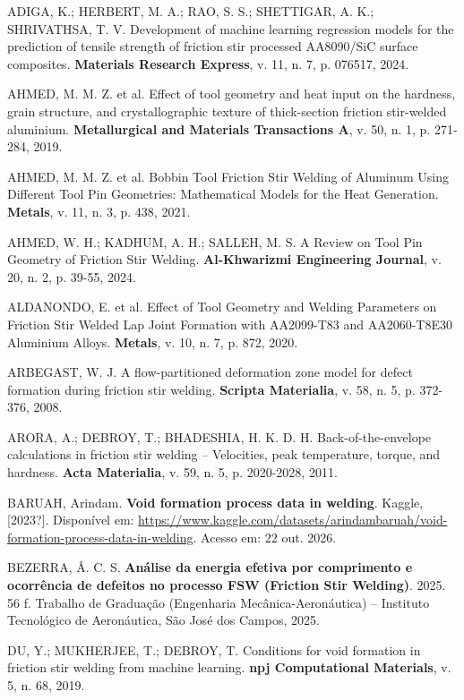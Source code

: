 \documentclass[12pt,openany]{report}
\begin{document}
\begin{singlespace}
\raggedright
\setlength{\parindent}{0pt}
\setlength{\parskip}{\baselineskip}
ADIGA, K.; HERBERT, M. A.; RAO, S. S.; SHETTIGAR, A. K.; SHRIVATHSA, T. V. Development of machine learning regression models for the prediction of tensile strength of friction stir processed AA8090/SiC surface composites. \textbf{Materials Research Express}, v. 11, n. 7, p. 076517, 2024.

AHMED, M. M. Z. et al. Effect of tool geometry and heat input on the hardness, grain structure, and crystallographic texture of thick-section friction stir-welded aluminium. \textbf{Metallurgical and Materials Transactions A}, v. 50, n. 1, p. 271-284, 2019.

AHMED, M. M. Z. et al. Bobbin Tool Friction Stir Welding of Aluminum Using Different Tool Pin Geometries: Mathematical Models for the Heat Generation. \textbf{Metals}, v. 11, n. 3, p. 438, 2021.

AHMED, W. H.; KADHUM, A. H.; SALLEH, M. S. A Review on Tool Pin Geometry of Friction Stir Welding. \textbf{Al-Khwarizmi Engineering Journal}, v. 20, n. 2, p. 39-55, 2024.

ALDANONDO, E. et al. Effect of Tool Geometry and Welding Parameters on Friction Stir Welded Lap Joint Formation with AA2099-T83 and AA2060-T8E30 Aluminium Alloys. \textbf{Metals}, v. 10, n. 7, p. 872, 2020.

ARBEGAST, W. J. A flow-partitioned deformation zone model for defect formation during friction stir welding. \textbf{Scripta Materialia}, v. 58, n. 5, p. 372-376, 2008.

ARORA, A.; DEBROY, T.; BHADESHIA, H. K. D. H. Back-of-the-envelope calculations in friction stir welding -- Velocities, peak temperature, torque, and hardness. \textbf{Acta Materialia}, v. 59, n. 5, p. 2020-2028, 2011.

BARUAH, Arindam. \textbf{Void formation process data in welding}. Kaggle, [2023?]. Disponível em: \url{https://www.kaggle.com/datasets/arindambaruah/void-formation-process-data-in-welding}. Acesso em: 22 out. 2026.

BEZERRA, Â. C. S. \textbf{Análise da energia efetiva por comprimento e ocorrência de defeitos no processo FSW (Friction Stir Welding)}. 2025. 56 f. Trabalho de Graduação (Engenharia Mecânica-Aeronáutica) -- Instituto Tecnológico de Aeronáutica, São José dos Campos, 2025.

DU, Y.; MUKHERJEE, T.; DEBROY, T. Conditions for void formation in friction stir welding from machine learning. \textbf{npj Computational Materials}, v. 5, n. 68, 2019.


\end{singlespace}
\end{document}
